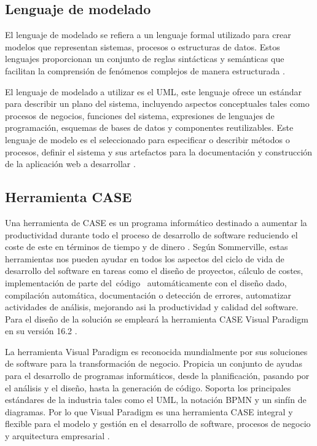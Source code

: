     
\subsection{Lenguaje de modelado}

El lenguaje de modelado se refiera a un lenguaje formal utilizado para crear 
modelos que representan sistemas, procesos o estructuras de datos. 
Estos lenguajes proporcionan un conjunto de reglas sintácticas y 
semánticas que facilitan la comprensión de fenómenos complejos de manera 
estructurada \citep{rumbaugh2004uml}.
        
El lenguaje de modelado a utilizar es el \ac{UML}, 
este lenguaje ofrece un estándar para describir un plano del sistema, 
incluyendo aspectos conceptuales tales como procesos de negocios, funciones 
del sistema, expresiones de lenguajes de programación, esquemas de bases de 
datos y componentes reutilizables. Este lenguaje de modelo 
es el seleccionado para especificar o describir métodos o procesos, definir el 
sistema y sus artefactos para la documentación y construcción de la aplicación 
web a desarrollar \citep{omg2017}.
    

\subsection{Herramienta CASE}

Una herramienta de \ac{CASE} 
es un programa informático destinado a aumentar la productividad durante 
todo el proceso de desarrollo de software reduciendo el coste de este en 
términos de tiempo y de dinero \citep{pressman2014se}. Según Sommerville, estas herramientas nos pueden ayudar 
en todos los aspectos del ciclo de vida de desarrollo del software en tareas como el 
diseño de proyectos, cálculo de costes, implementación de parte del código 
automáticamente con el diseño dado, compilación automática, documentación o 
detección de errores, automatizar actividades de análisis, mejorando asi la productividad
y calidad del software. Para el diseño de la 
solución se empleará la herramienta \ac{CASE} 
Visual Paradigm en su versión 16.2 \citep{sommerville2016se}.

La herramienta Visual Paradigm es reconocida mundialmente por sus soluciones 
de software para la transformación de negocio. Propicia un conjunto de ayudas 
para el desarrollo de programas informáticos, desde la planificación, pasando 
por el análisis y el diseño, hasta la generación de código. Soporta los 
principales estándares de la industria tales como el \ac{UML}, la notación \ac{BPMN} y un 
sinfín de diagramas.  Por lo que Visual Paradigm es una herramienta \ac{CASE} 
integral y flexible para el modelo y gestión en el desarrollo de software, 
procesos de negocio y arquitectura empresarial \citep{visualparadigm2024}.

